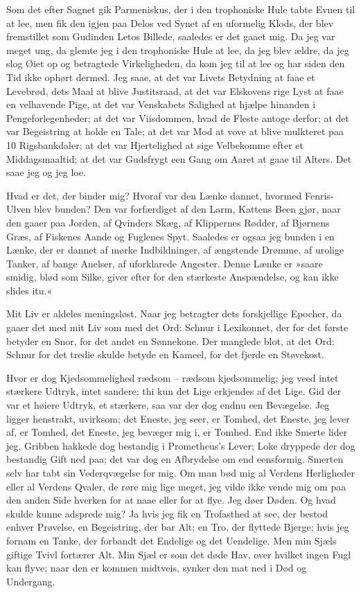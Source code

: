\documentclass[12pt,a4paper]{article}
\begin{document}
Som det efter Sagnet gik Parmeniskus, der i den trophoniske Hule tabte Evnen til at lee, men fik den igjen paa Delos ved Synet af en uformelig Klods, der blev fremstillet som Gudinden Letos Billede, saaledes er det gaaet mig. Da jeg var meget ung, da glemte jeg i den trophoniske Hule at lee, da jeg blev ældre, da jeg slog Øiet op og betragtede Virkeligheden, da kom jeg til at lee og har siden den Tid ikke ophørt dermed. Jeg saae, at det var Livets Betydning at faae et Levebrød, dets Maal at blive Justitsraad, at det var Elskovens rige Lyst at faae en velhavende Pige, at det var Venskabets Salighed at hjælpe hinanden i Pengeforlegenheder; at det var Viisdommen, hvad de Fleste antoge derfor; at det var Begeistring at holde en Tale; at det var Mod at vove at blive mulkteret paa 10 Rigsbankdaler; at det var Hjertelighed at sige Velbekomme efter et Middagsmaaltid; at det var Gudsfrygt een Gang om Aaret at gaae til Alters. Det saae jeg og jeg loe.

Hvad er det, der binder mig? Hvoraf var den Lænke dannet, hvormed Fenris-Ulven blev bunden? Den var forfærdiget af den Larm, Kattens Been gjør, naar den gaaer paa Jorden, af Qvinders Skæg, af Klippernes Rødder, af Bjørnens Græs, af Fiskenes Aande og Fuglenes Spyt. Saaledes er ogsaa jeg bunden i en Lænke, der er dannet af mørke Indbildninger, af ængstende Drømme, af urolige Tanker, af bange Anelser, af uforklarede Angester. Denne Lænke er »saare smidig, blød som Silke, giver efter for den stærkeste Anspændelse, og kan ikke slides itu.«

Mit Liv er aldeles meningsløst. Naar jeg betragter dets forskjellige Epocher, da gaaer det med mit Liv som med det Ord: Schnur i Lexikonnet, der for det første betyder en Snor, for det andet en Sønnekone. Der manglede blot, at det Ord: Schnur for det tredie skulde betyde en Kameel, for det fjerde en Støvekost.

Hvor er dog Kjedsommelighed rædsom – rædsom kjedsommelig; jeg veed intet stærkere Udtryk, intet sandere; thi kun det Lige erkjendes af det Lige. Gid der var et høiere Udtryk, et stærkere, saa var der dog endnu een Bevægelse. Jeg ligger henstrakt, uvirksom; det Eneste, jeg seer, er Tomhed, det Eneste, jeg lever af, er Tomhed, det Eneste, jeg bevæger mig i, er Tomhed. End ikke Smerte lider jeg. Gribben hakkede dog bestandig i Prometheus's Lever; Loke dryppede der dog bestandig Gift ned paa; det var dog en Afbrydelse om end eensformig. Smerten selv har tabt sin Vederqvægelse for mig. Om man bød mig al Verdens Herligheder eller al Verdens Qvaler, de røre mig lige meget, jeg vilde ikke vende mig om paa den anden Side hverken for at naae eller for at flye. Jeg døer Døden. Og hvad skulde kunne adsprede mig? Ja hvis jeg fik en Trofasthed at see, der bestod enhver Prøvelse, en Begeistring, der bar Alt; en Tro, der flyttede Bjerge; hvis jeg fornam en Tanke, der forbandt det Endelige og det Uendelige. Men min Sjæls giftige Tvivl fortærer Alt. Min Sjæl er som det døde Hav, over hvilket ingen Fugl kan flyve; naar den er kommen midtveis, synker den mat ned i Død og Undergang.
\end{document}
